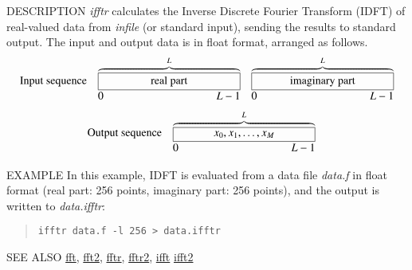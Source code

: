 \begin{synopsis}
 \item[ifftr] [ --l $L$ ] [ --m $M$ ] [ {\em infile} ]
\end{synopsis}

\begin{qsection}{DESCRIPTION}
{\em ifftr} calculates the Inverse Discrete Fourier Transform (IDFT)
of real-valued data from {\em infile} (or standard input),
sending the results to standard output.
The input and output data is in float format, arranged as follows.
\begin{displaymath}
\begin{array}{lll}
\mbox{Input sequence} & \overbrace{\framebox[4.5cm]{real part}}^{L} &
           \overbrace{\framebox[4.5cm]{imaginary part}}^{L} \\
                & \makebox[4.5cm]{0\hfill $L-1$} &
                \makebox[4.5cm]{0\hfill $L-1$}
\end{array}
\end{displaymath}
\begin{displaymath}
\begin{array}{lll}
\mbox{Output sequence} & 
\overbrace{\framebox[4.5cm]{$x_0, x_1, \ldots, x_{M}$}}^{L}  & \\
                & \makebox[4.5cm]{0\hfill $L-1$} &
\end{array}
\end{displaymath}
\end{qsection}

\begin{options}
\end{options}

\begin{qsection}{EXAMPLE}
In this example, IDFT is evaluated from a data file
{\em data.f} in float format
(real part: 256 points, imaginary part: 256 points),
and the output is written to {\em data.ifftr}:
\begin{quote}
  \verb!ifftr data.f -l 256 > data.ifftr!
\end{quote}
\end{qsection}

\begin{qsection}{SEE ALSO}
\hyperlink{fft}{fft},
\hyperlink{fft2}{fft2},
\hyperlink{fftr}{fftr},
\hyperlink{fftr2}{fftr2},
\hyperlink{ifft}{ifft}
\hyperlink{ifft2}{ifft2}
\end{qsection}
